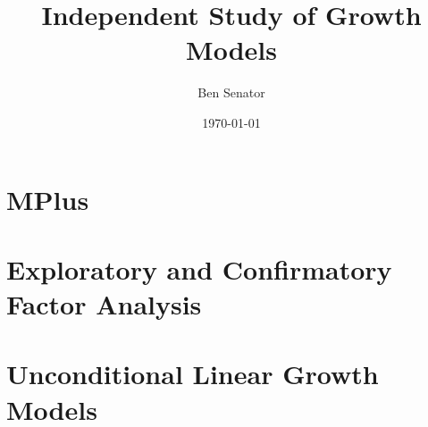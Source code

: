\documentclass{article}
\title{Independent Study of Growth Models}
\author{Ben Senator}
\date{\today}
\begin{document}
\maketitle

\tableofcontents

\newpage

\section{MPlus}

\section{Exploratory and Confirmatory Factor Analysis}

\section{Unconditional Linear Growth Models}
\end{document}
